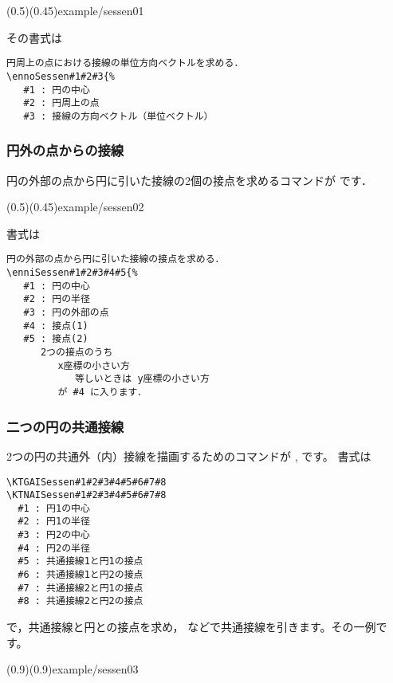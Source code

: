 \showexample[　円周上の点における接線](0.5)(0.45){example/sessen01}

その書式は

\begin{boxnote}
\begin{verbatim}
円周上の点における接線の単位方向ベクトルを求める．
\ennoSessen#1#2#3{%
   #1 : 円の中心
   #2 : 円周上の点
   #3 : 接線の方向ベクトル（単位ベクトル）
\end{verbatim}
\end{boxnote}

\subsubsection{円外の点からの接線}
円の外部の点から円に引いた接線の2個の接点を求めるコマンドが
です．

\showexample[円外の点からの接線](0.5)(0.45){example/sessen02}

書式は
\begin{boxnote}
\begin{verbatim}
円の外部の点から円に引いた接線の接点を求める．
\enniSessen#1#2#3#4#5{%
   #1 : 円の中心
   #2 : 円の半径
   #3 : 円の外部の点
   #4 : 接点(1)
   #5 : 接点(2)
      2つの接点のうち
         x座標の小さい方
            等しいときは y座標の小さい方
         が #4 に入ります．
\end{verbatim}
\end{boxnote}

\subsubsection{二つの円の共通接線}
2つの円の共通外（内）接線を描画するためのコマンドが
,  です。
書式は 
\begin{boxnote}
\begin{verbatim}
\KTGAISessen#1#2#3#4#5#6#7#8
\KTNAISessen#1#2#3#4#5#6#7#8
  #1 : 円1の中心
  #2 : 円1の半径
  #3 : 円2の中心
  #4 : 円2の半径
  #5 : 共通接線1と円1の接点
  #6 : 共通接線1と円2の接点
  #7 : 共通接線2と円1の接点
  #8 : 共通接線2と円2の接点
\end{verbatim}
\end{boxnote}
\noindent
で，共通接線と円との接点を求め，
 などで共通接線を引きます。その一例です。

\showexample[共通接線](0.9)(0.9){example/sessen03}


